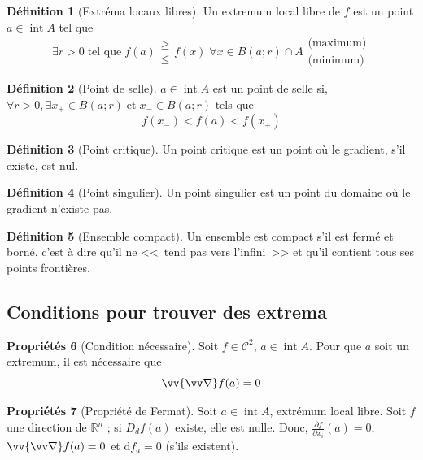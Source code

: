 \documentclass[11pt,a4paper]{article}
\theoremstyle{definition}
\newtheorem{mydef}{Définition}[section]
\newtheorem{myprop}[mydef]{Propriétés}
\newcommand{\R}{\mathbb{R}}
\newcommand{\dif}{\mathrm{d}}
\DeclareMathOperator{\newint}{int}
\let\oldnabla\nabla
\renewcommand{\nabla}{\vv{\oldnabla}}
\newcommand{\pa}{\partial}
\begin{document}
\begin{mydef}[Extréma locaux libres]
Un extremum local libre de $f$ est un point $a \in \newint A$ tel que
\[ \exists r > 0 \; \text{tel que} \; f(a) \begin{array}{l} \geq \\ \leq \end{array} f(x) \; \forall x \in B(a;r)\cap A \begin{array}{l} \text{(maximum)} \\ \text{(minimum)} \end{array} \]
\end{mydef}

\begin{mydef}[Point de selle] $a \in \newint A$ est un point de selle si, $\forall r >0, \exists x_+ \in B(a;r) \; \text{et} \; x_- \in B(a;r)$ tels que
\[ f(x_-) < f(a) < f(x_+) \]
\end{mydef}

\begin{mydef}[Point critique] Un point critique est un point où le gradient, s'il existe, est nul. \end{mydef}

\begin{mydef}[Point singulier] Un point singulier est un point du domaine où le gradient n'existe pas. \end{mydef}

\begin{mydef}[Ensemble compact] Un  ensemble est compact s'il est fermé et borné, c'est à dire qu'il ne <<~tend pas vers l'infini~>> et qu'il contient tous ses points frontières. \end{mydef}

\subsection{Conditions pour trouver des extrema}

\begin{myprop}[Condition nécessaire]
Soit $f \in \mathcal{C}^2$, $a \in \newint A$. Pour que $a$ soit un extremum, il est nécessaire que
\[ \nabla f(a) = 0 \]
\end{myprop}

\begin{myprop}[Propriété de Fermat]
Soit $a \in \newint A$, extrémum local libre. Soit $f$ une direction de $\R^n$ ; si $D_df(a)$ existe, elle est nulle. Donc, $\frac{\pa f}{\pa x_i}(a) = 0$, $\nabla f(a) = 0$ et $\dif f_a = 0$ (s'ils existent).
\end{myprop}
\end{document}
